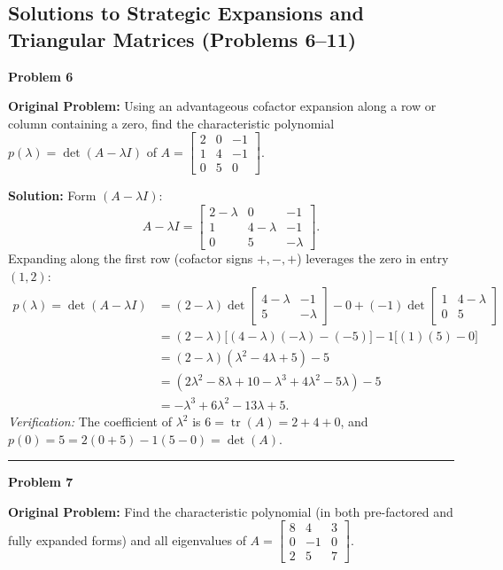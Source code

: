 \documentclass[11pt, letterpaper]{article}
\theoremstyle{definition}
\theoremstyle{remark}
\begin{document}
\subsection{Solutions to Strategic Expansions and Triangular Matrices (Problems 6--11)}

\noindent\textbf{Problem 6}

\textbf{Original Problem:} Using an advantageous cofactor expansion along a row or column containing a zero, find the characteristic polynomial $p(\lambda) = \det(A - \lambda I)$ of $A = \begin{bmatrix} 2 & 0 & -1 \\ 1 & 4 & -1 \\ 0 & 5 & 0 \end{bmatrix}$.

\textbf{Solution:} Form $(A - \lambda I)$:
\[
A - \lambda I = \begin{bmatrix} 2 - \lambda & 0 & -1 \\ 1 & 4 - \lambda & -1 \\ 0 & 5 & -\lambda \end{bmatrix}.
\]
Expanding along the first row (cofactor signs $+, -, +$) leverages the zero in entry $(1, 2)$:
\begin{align*}
p(\lambda) = \det(A - \lambda I) &= (2 - \lambda)\det\begin{bmatrix} 4 - \lambda & -1 \\ 5 & -\lambda \end{bmatrix} - 0 + (-1)\det\begin{bmatrix} 1 & 4 - \lambda \\ 0 & 5 \end{bmatrix} \\
&= (2 - \lambda)\big[(4 - \lambda)(-\lambda) - (-5)\big] - 1\big[(1)(5) - 0\big] \\
&= (2 - \lambda)(\lambda^2 - 4\lambda + 5) - 5 \\
&= (2\lambda^2 - 8\lambda + 10 - \lambda^3 + 4\lambda^2 - 5\lambda) - 5 \\
&= -\lambda^3 + 6\lambda^2 - 13\lambda + 5.
\end{align*}
\textit{Verification:} The coefficient of $\lambda^2$ is $6 = \operatorname{tr}(A) = 2 + 4 + 0$, and $p(0) = 5 = 2(0 + 5) - 1(5 - 0) = \det(A)$.

\noindent\rule{\textwidth}{0.4pt}

\noindent\textbf{Problem 7}

\textbf{Original Problem:} Find the characteristic polynomial (in both pre-factored and fully expanded forms) and all eigenvalues of $A = \begin{bmatrix} 8 & 4 & 3 \\ 0 & -1 & 0 \\ 2 & 5 & 7 \end{bmatrix}$.
\end{document}

